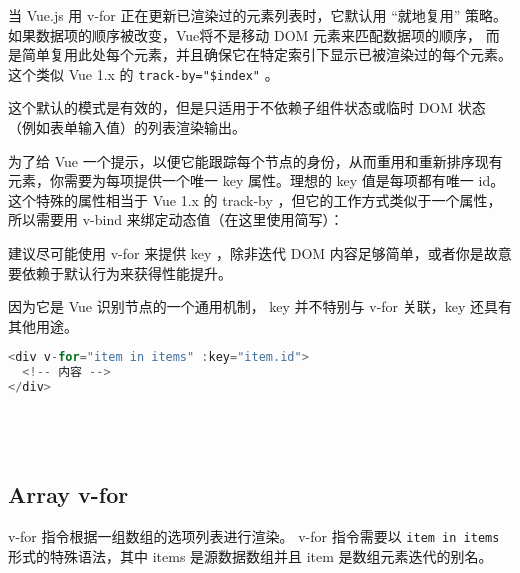 当 Vue.js 用 v-for 正在更新已渲染过的元素列表时，它默认用 “就地复用” 策略。如果数据项的顺序被改变，Vue将不是移动 DOM 元素来匹配数据项的顺序， 而是简单复用此处每个元素，并且确保它在特定索引下显示已被渲染过的每个元素。这个类似 Vue 1.x 的 \texttt{track-by="\$index"} 。

这个默认的模式是有效的，但是只适用于不依赖子组件状态或临时 DOM 状态（例如表单输入值）的列表渲染输出。

为了给 Vue 一个提示，以便它能跟踪每个节点的身份，从而重用和重新排序现有元素，你需要为每项提供一个唯一 key 属性。理想的 key 值是每项都有唯一 id。这个特殊的属性相当于 Vue 1.x 的 track-by ，但它的工作方式类似于一个属性，所以需要用 v-bind 来绑定动态值（在这里使用简写）：

建议尽可能使用 v-for 来提供 key ，除非迭代 DOM 内容足够简单，或者你是故意要依赖于默认行为来获得性能提升。


因为它是 Vue 识别节点的一个通用机制， key 并不特别与 v-for 关联，key 还具有其他用途。

\begin{lstlisting}[language=JavaScript]
<div v-for="item in items" :key="item.id">
  <!-- 内容 -->
</div>
\end{lstlisting}



\begin{lstlisting}[language=JavaScript]

\end{lstlisting}




\begin{lstlisting}[language=JavaScript]

\end{lstlisting}



\begin{lstlisting}[language=JavaScript]

\end{lstlisting}



\begin{lstlisting}[language=JavaScript]

\end{lstlisting}




\subsection{Array v-for}

v-for 指令根据一组数组的选项列表进行渲染。 v-for 指令需要以 \texttt{item in items}形式的特殊语法，其中 items 是源数据数组并且 item 是数组元素迭代的别名。

